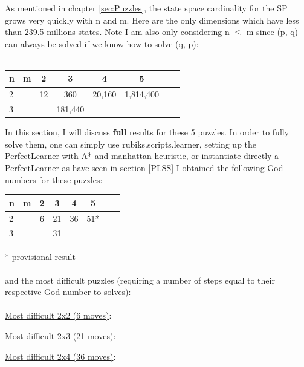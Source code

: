 As mentioned in chapter \ref{sec:Puzzles}, the state space cardinality for the SP grows very quickly with n and m. Here are the only dimensions which have less than 239.5 millions states. Note I am also only considering n $\leq$ m since (p, q) can always be solved if we know how to solve (q, p):
\\
\\
\begin{center}
\begin{tabular}{l*{6}{c}r}
n              & m & 2 & 3 & 4 & 5\\
\hline
2              &   & 12 & 360 & 20,160 & 1,814,400 \\
3              &   &   & 181,440 &  &    \\
\end{tabular}
\end{center}
In this section, I will discuss \textbf{full} results for these 5 puzzles. In order to fully solve them, one can simply use rubiks.scripts.learner, setting up the PerfectLearner with A* and manhattan heuristic, or instantiate directly a PerfectLearner as have seen in section \ref{PLSS}
I obtained the following God numbers for these puzzles:
\begin{center}
\begin{tabular}{l*{6}{c}r}
n              & m & 2 & 3 & 4 & 5\\
\hline
2              &   & 6 & 21 & 36 & 51* \\
3              &   &   & 31 &  &    \\
\end{tabular}
\end{center}
* provisional result
\\
\\
and the most difficult puzzles (requiring a number of steps equal to their respective God number to solves):
\\
\\
\underline{Most difficult 2x2 (6 moves)}:
\begin{center}
\begin{three}
\end{three}
\end{center}
\underline{Most difficult 2x3 (21 moves)}:
\begin{center}
\begin{five}
\end{five}
\end{center}
\underline{Most difficult 2x4 (36 moves)}:
